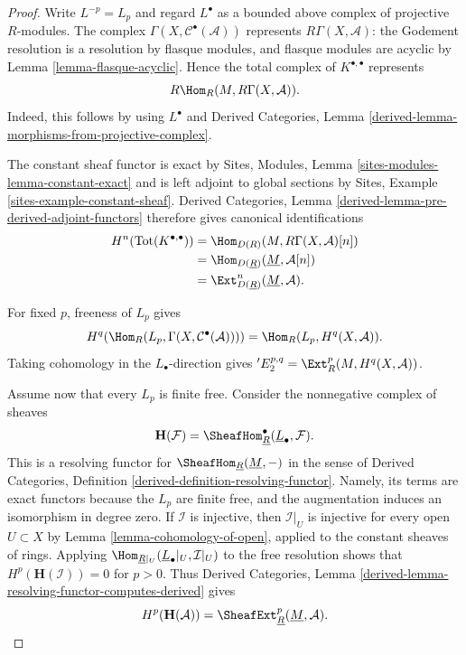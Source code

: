 \begin{proof}
Write $L^{-p} = L_p$ and regard $L^\bullet$ as a bounded above complex
of projective $R$-modules. The complex
$\Gamma(X, \mathcal{C}^\bullet(\mathcal{A}))$ represents
$R\Gamma(X, \mathcal{A})$: the Godement resolution is a resolution by
flasque modules, and flasque modules are acyclic by
Lemma \ref{lemma-flasque-acyclic}. Hence the total complex of
$K^{\bullet, \bullet}$ represents
$$
R\Hom_R(M, R\Gamma(X, \mathcal{A})).
$$
Indeed, this follows by using $L^\bullet$ and
Derived Categories, Lemma
\ref{derived-lemma-morphisms-from-projective-complex}.

The constant sheaf functor is exact by Sites, Modules, Lemma
\ref{sites-modules-lemma-constant-exact} and is left adjoint to global
sections by Sites, Example \ref{sites-example-constant-sheaf}. Derived
Categories, Lemma \ref{derived-lemma-pre-derived-adjoint-functors}
therefore gives canonical identifications
$$
\begin{aligned}
H^n(\text{Tot}(K^{\bullet, \bullet}))
& = \Hom_{D(R)}(M, R\Gamma(X, \mathcal{A})[n]) \\
& = \Hom_{D(\underline{R})}(\underline{M}, \mathcal{A}[n]) \\
& = \Ext^n_{D(\underline{R})}(\underline{M}, \mathcal{A}).
\end{aligned}
$$

For fixed $p$, freeness of $L_p$ gives
$$
H^q(\Hom_R(L_p, \Gamma(X, \mathcal{C}^\bullet(\mathcal{A}))))
= \Hom_R(L_p, H^q(X, \mathcal{A})).
$$
Taking cohomology in the $L_\bullet$-direction gives
${}'E_2^{p, q} = \Ext_R^p(M, H^q(X, \mathcal{A}))$.

Assume now that every $L_p$ is finite free. Consider the nonnegative
complex of sheaves
$$
\mathbf{H}(\mathcal{F}) =
\SheafHom^\bullet_{\underline{R}}(\underline{L}_\bullet, \mathcal{F}).
$$
This is a resolving functor for
$\SheafHom_{\underline{R}}(\underline{M}, -)$ in the sense of
Derived Categories, Definition
\ref{derived-definition-resolving-functor}. Namely, its terms are exact
functors because the $L_p$ are finite free, and the augmentation induces
an isomorphism in degree zero. If $\mathcal{I}$ is injective, then
$\mathcal{I}|_U$ is injective for every open $U \subset X$ by
Lemma \ref{lemma-cohomology-of-open}, applied to the constant sheaves of
rings. Applying
$\Hom_{\underline{R}|_U}(\underline{L}_\bullet|_U, \mathcal{I}|_U)$
to the free resolution shows that
$H^p(\mathbf{H}(\mathcal{I})) = 0$ for $p > 0$. Thus Derived
Categories, Lemma
\ref{derived-lemma-resolving-functor-computes-derived} gives
$$
H^p(\mathbf{H}(\mathcal{A})) =
\SheafExt^p_{\underline{R}}(\underline{M}, \mathcal{A}).
$$


\end{proof}
